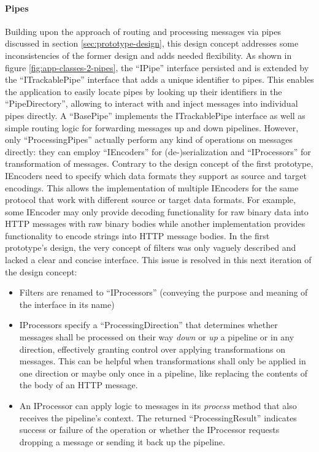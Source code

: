 \paragraph{Pipes} Building upon the approach of routing and processing messages via pipes discussed in section \ref{sec:prototype-design}, this design concept addresses some inconsistencies of the former design and adds needed flexibility. As shown in figure \ref{fig:app-classes-2-pipes}, the \enquote{IPipe} interface persisted and is extended by the \enquote{ITrackablePipe} interface that adds a unique identifier to pipes. This enables the application to easily locate pipes by looking up their identifiers in the \enquote{PipeDirectory}, allowing to interact with and inject messages into individual pipes directly. A \enquote{BasePipe} implements the ITrackablePipe interface as well as simple routing logic for forwarding messages up and down pipelines. However, only \enquote{ProcessingPipes} actually perform any kind of operations on messages directly: they can employ \enquote{IEncoders} for (de-)serialization and \enquote{IProcessors} for transformation of messages. Contrary to the design concept of the first prototype, IEncoders need to specify which data formats they support as source and target encodings. This allows the implementation of multiple IEncoders for the same protocol that work with different source or target data formats. For example, some IEncoder may only provide decoding functionality for raw binary data into \ac{HTTP} messages with raw binary bodies while another implementation provides functionality to encode strings into \ac{HTTP} message bodies. In the first prototype's design, the very concept of filters was only vaguely described and lacked a clear and concise interface. This issue is resolved in this next iteration of the design concept:
\begin{itemize}
    \item Filters are renamed to \enquote{IProcessors} (conveying the purpose and meaning of the interface in its name)
    \item IProcessors specify a \enquote{ProcessingDirection} that determines whether messages shall be processed on their way \emph{down} or \emph{up} a pipeline or in any direction, effectively granting control over applying transformations on messages. This can be helpful when transformations shall only be applied in one direction or maybe only once in a pipeline, like replacing the contents of the body of an \ac{HTTP} message.
    \item An IProcessor can apply logic to messages in its \emph{process} method that also receives the pipeline's context. The returned \enquote{ProcessingResult} indicates success or failure of the operation or whether the IProcessor requests dropping a message or sending it back up the pipeline.
\end{itemize}

